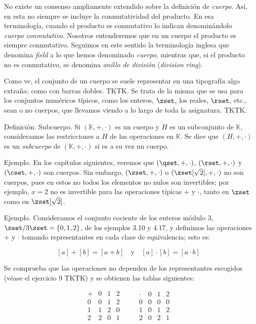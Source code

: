 No existe un consenso ampliamente extendido sobre la definición de
\emph{cuerpo}. Así, en esta no siempre se incluye la conmutatividad del
producto. En esa terminología, cuando el producto es conmutativo lo indican
denominándolo \emph{cuerpo conmutativo}. Nosotros entenderemos que en un
cuerpo el producto es siempre conmutativo. Seguimos en este sentido la
terminología inglesa que denomina \emph{field} a lo que hemos denominado
\emph{cuerpo}, mientras que, si el producto no es conmutativo, se denomina
\emph{anillo de división} (\emph{division ring}).

Como ve, el conjunto de un cuerpo se suele representar en una tipografía
algo extraña; como con barras dobles. TKTK. Se trata de la misma que se usa
para los conjuntos numéricos típicos, como los enteros, $\zset$, los reales,
$\rset$, etc., sean o no cuerpos, que llevamos viendo a lo largo de toda la
asignatura. TKTK.

Definición. Subcuerpo. Si $(\mathbb{K}, +, \cdot)$ es un cuerpo y $H$ es un
subconjunto de $\mathbb{K}$, consideramos las restricciones a $H$ de las
operaciones en $\mathbb{K}$. Se dice que $(H, +, \cdot)$ es un
\emph{subcuerpo} de $(\mathbb{K}, +, \cdot)$ si es a su vez un cuerpo.

Ejemplo. En los capítulos siguientes, veremos que $(\qset, +, \cdot)$,
$(\rset, +, \cdot)$ y $(\cset, +, \cdot)$ son cuerpos. Sin embargo, $(\zset,
+, \cdot)$ o $(\zset[\sqrt{2}], +, \cdot)$ no son cuerpos, pues en estos no
todos los elementos no nulos son invertibles; por ejemplo, $x = 2$ no es
invertible para las operaciones típicas $+$ y $\cdot$, tanto en $\zset$ como
en $\zset[\sqrt{2}]$.

Ejemplo. Consideramos el conjunto cociente de los enteros módulo 3,
$\zset/3\zset = \{0, 1, 2\}$, de los ejemplos 3.10 y 4.17, y definimos las
operaciones $+$ y $\cdot$ tomando representantes en cada clase de
equivalencia; esto es:

$$ [a] + [b] = [a + b] \quad \text{y} \quad [a] \cdot [b] = [a \cdot b] $$

Se comprueba que las operaciones no dependen de los representantes escogidos
(véase el ejercicio 9 TKTK) y se obtienen las tablas siguientes:

$$
  \begin{array}{c|ccc}
  + & 0 & 1 & 2 \\
  \hline
  0 & 0 & 1 & 2 \\
  1 & 1 & 2 & 0 \\
  2 & 2 & 0 & 1
  \end{array}
  \qquad
  \begin{array}{c|ccc}
  \cdot & 0 & 1 & 2 \\
  \hline
  0 & 0 & 0 & 0 \\
  1 & 0 & 1 & 2 \\
  2 & 0 & 2 & 1
  \end{array}
$$

